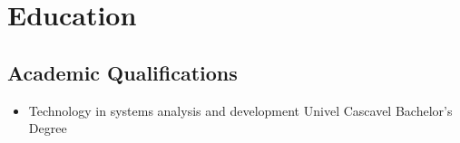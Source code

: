 \section{Education}
\vspace{5pt}

\subsection{Academic Qualifications}

\vspace{5pt}

\begin{itemize}
\item{
{Technology in systems analysis and development}
{Univel}
{Cascavel}
{Bachelor's Degree}
{}
}
\end{itemize}